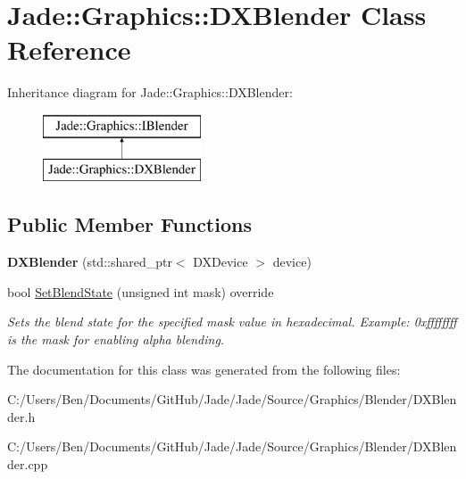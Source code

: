 \hypertarget{class_jade_1_1_graphics_1_1_d_x_blender}{}\section{Jade\+:\+:Graphics\+:\+:D\+X\+Blender Class Reference}
\label{class_jade_1_1_graphics_1_1_d_x_blender}
Inheritance diagram for Jade\+:\+:Graphics\+:\+:D\+X\+Blender\+:\begin{figure}[H]
\begin{center}
\leavevmode
\includegraphics[height=2.000000cm]{class_jade_1_1_graphics_1_1_d_x_blender}
\end{center}
\end{figure}
\subsection*{Public Member Functions}
\begin{DoxyCompactItemize}
\item 
\hypertarget{class_jade_1_1_graphics_1_1_d_x_blender_a61676202a6e4ac9fe2120bb51f729f5e}{}{\bfseries D\+X\+Blender} (std\+::shared\+\_\+ptr$<$ D\+X\+Device $>$ device)\label{class_jade_1_1_graphics_1_1_d_x_blender_a61676202a6e4ac9fe2120bb51f729f5e}

\item 
\hypertarget{class_jade_1_1_graphics_1_1_d_x_blender_af73d473e115c375593a9985f6b310004}{}bool \hyperlink{class_jade_1_1_graphics_1_1_d_x_blender_af73d473e115c375593a9985f6b310004}{Set\+Blend\+State} (unsigned int mask) override\label{class_jade_1_1_graphics_1_1_d_x_blender_af73d473e115c375593a9985f6b310004}

\begin{DoxyCompactList}\small\item\em Sets the blend state for the specified mask value in hexadecimal. Example\+: 0xffffffff is the mask for enabling alpha blending. \end{DoxyCompactList}\end{DoxyCompactItemize}


The documentation for this class was generated from the following files\+:\begin{DoxyCompactItemize}
\item 
C\+:/\+Users/\+Ben/\+Documents/\+Git\+Hub/\+Jade/\+Jade/\+Source/\+Graphics/\+Blender/D\+X\+Blender.\+h\item 
C\+:/\+Users/\+Ben/\+Documents/\+Git\+Hub/\+Jade/\+Jade/\+Source/\+Graphics/\+Blender/D\+X\+Blender.\+cpp\end{DoxyCompactItemize}
